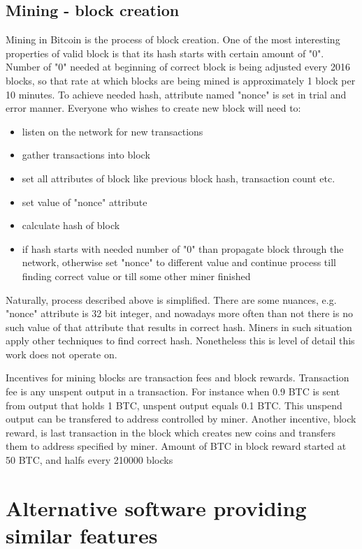 \documentclass[12pt, en, eng, oneside, final]{mgr}
\begin{document}
\section{Mining - block creation}
Mining in Bitcoin is the process of block creation. One of the most interesting properties of valid block is that its hash starts with certain amount of "0". Number of "0" needed at beginning of correct block is being adjusted every 2016 blocks, so that rate at which blocks are being mined is approximately 1 block per 10 minutes. To achieve needed hash, attribute named "nonce" is set in trial and error manner. Everyone who wishes to create new block will need to:

\begin{itemize}
\item
listen on the network for new transactions
\item
gather transactions into block
\item
set all attributes of block like previous block hash, transaction count etc.
\item
set value of "nonce" attribute
\item
calculate hash of block
\item
if hash starts with needed number of "0" than propagate block through the network, otherwise set "nonce" to different value and continue process till finding correct value or till some other miner finished 
\end{itemize}

Naturally, process described above is simplified. There are some nuances, e.g. "nonce" attribute is 32 bit integer, and nowadays more often than not there is no such value of that attribute that results in correct hash. Miners in such situation apply other techniques to find correct hash. Nonetheless this is level of detail this work does not operate on.
 
Incentives for mining blocks are transaction fees and block rewards. Transaction fee is any unspent output in a transaction. For instance when 0.9 BTC is sent from output that holds 1 BTC, unspent output equals 0.1 BTC. This unspend output can be transfered to address controlled by miner.  
Another incentive, block reward, is last transaction in the block which creates new coins and transfers them to address specified by miner. Amount of BTC in block reward started at 50 BTC, and halfs every 210000 blocks \cite{currency-supply}


\chapter{Alternative software providing similar features}
\end{document}

